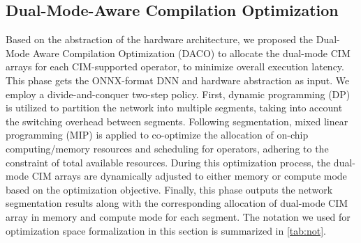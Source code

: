 \subsection{Dual-Mode-Aware Compilation Optimization}
Based on the abstraction of the hardware architecture, we proposed the Dual-Mode Aware Compilation Optimization (DACO) to allocate the dual-mode CIM arrays for each CIM-supported operator, to minimize overall execution latency.
This phase gets the ONNX-format DNN and hardware abstraction as input. 
We employ a divide-and-conquer two-step policy.
First, dynamic programming (DP) is utilized to partition the network into multiple segments, taking into account the switching overhead between segments.
Following segmentation, mixed linear programming (MIP) is applied to co-optimize the allocation of on-chip computing/memory resources and scheduling for operators, adhering to the constraint of total available resources. 
During this optimization process, the dual-mode CIM arrays are dynamically adjusted to either memory or compute mode based on the optimization objective. 
Finally, this phase outputs the network segmentation results along with the corresponding allocation of dual-mode CIM array in memory and compute mode for each segment. %
The notation we used for optimization space formalization in this section is summarized in \tab \ref{tab:not}. 

